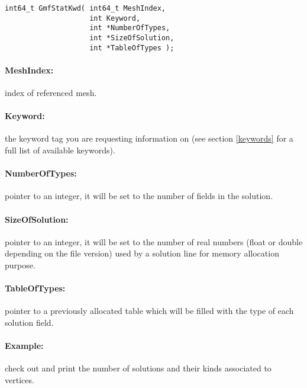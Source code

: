 \documentclass[a4paper,12pt]{article}
\begin{document}
\begin{tt}
\begin{verbatim}
int64_t GmfStatKwd( int64_t MeshIndex,
                    int Keyword,
                    int *NumberOfTypes,
                    int *SizeOfSolution,
                    int *TableOfTypes );
\end{verbatim}
\end{tt}
\normalfont

\paragraph{MeshIndex:} index of referenced mesh.

\paragraph{Keyword:} the keyword tag you are requesting information on (see section \ref{keywords} for a full list of available keywords).

\paragraph{NumberOfTypes:} pointer to an integer, it will be set to the number of fields in the solution.

\paragraph{SizeOfSolution:} pointer to an integer, it will be set to the number of real numbers (float or double depending on the file version) used by a solution line for memory allocation purpose.

\paragraph{TableOfTypes:} pointer to a previously allocated table which will be filled with the type of each solution field.

\paragraph{Example:} check out and print the number of solutions and their kinds associated to vertices.
\end{document}
